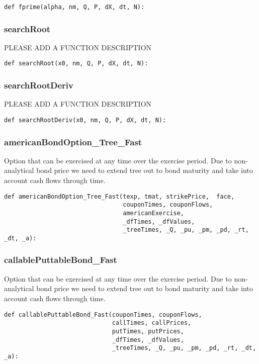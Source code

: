 \documentclass[twoside,11pt]{book}
\begin{document}
\begin{lstlisting}
def fprime(alpha, nm, Q, P, dX, dt, N):
\end{lstlisting}

\subsubsection*{{\bf searchRoot}}
PLEASE ADD A FUNCTION DESCRIPTION

\begin{lstlisting}
def searchRoot(x0, nm, Q, P, dX, dt, N):
\end{lstlisting}

\subsubsection*{{\bf searchRootDeriv}}
PLEASE ADD A FUNCTION DESCRIPTION

\begin{lstlisting}
def searchRootDeriv(x0, nm, Q, P, dX, dt, N):
\end{lstlisting}

\subsubsection*{{\bf americanBondOption\_Tree\_Fast}}
Option that can be exercised at any time over the exercise period. Due to non-analytical bond price we need to extend tree out to bond maturity and take into account cash flows through time.  

\begin{lstlisting}
def americanBondOption_Tree_Fast(texp, tmat, strikePrice,  face,
                                 couponTimes, couponFlows,
                                 americanExercise,
                                 _dfTimes, _dfValues,
                                 _treeTimes, _Q, _pu, _pm, _pd, _rt, _dt, _a):
\end{lstlisting}

\subsubsection*{{\bf callablePuttableBond\_Fast}}
Option that can be exercised at any time over the exercise period. Due to non-analytical bond price we need to extend tree out to bond maturity and take into account cash flows through time.  

\begin{lstlisting}
def callablePuttableBond_Fast(couponTimes, couponFlows,
                              callTimes, callPrices,
                              putTimes, putPrices,
                              _dfTimes, _dfValues,
                              _treeTimes, _Q, _pu, _pm, _pd, _rt, _dt, _a):
\end{lstlisting}
\end{document}
